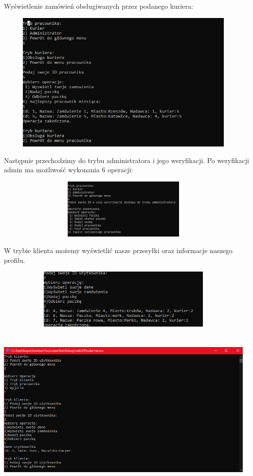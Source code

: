 Wyświetlenie zamówień obsługiwanych przez podanego kuriera:
\begin{center}
\includegraphics[width=13.0cm, height=7.0cm]{kurier moje zamowienia.png}
\end{center}

Następnie przechodzimy do trybu administratora i jego weryfikacji. Po weryfikacji admin ma możliwość wykonania 6 operacji:
\begin{center}
\includegraphics[width=13.0cm, height=3.0cm]{weryfikacja kurier.png}
\end{center}

W trybie klienta możemy wyświetlić nasze przesyłki oraz informacje naszego profilu.
\begin{center}
\includegraphics[width=13.0cm, height=3.0cm]{Klient moje paczki.png}
\end{center}
\begin{center}
\includegraphics[width=13.0cm, height=8.0cm]{Klient informacje osoby.png}
\end{center}

